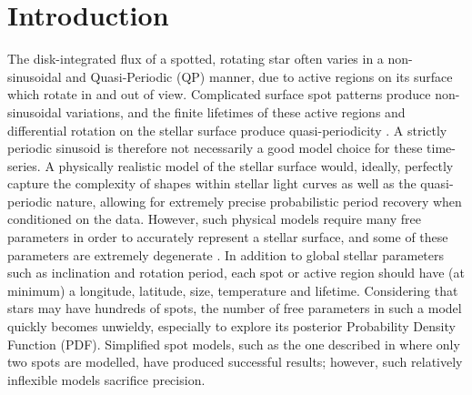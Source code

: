 \documentclass[a4paper,fleqn,usenatbib,useAMS]{mnras}
\newcommand{\eg}{{\it e.g.}}
\begin{document}
\section{Introduction}
\label{sec:intro}

The disk-integrated flux of a spotted, rotating star often varies in a
non-sinusoidal and Quasi-Periodic (QP) manner, due to active regions on its
surface which rotate in and out of view.
Complicated surface spot patterns produce non-sinusoidal variations, and the
finite lifetimes of these active regions and differential rotation on the
stellar surface produce quasi-periodicity \citep{Dumusque2011}.
A strictly periodic sinusoid is therefore not necessarily a good model choice
for these time-series.
A physically realistic model of the stellar surface
would, ideally,  perfectly capture the complexity of shapes
within stellar light curves as well as the quasi-periodic nature, allowing for
extremely precise probabilistic period recovery when conditioned on the data.
However, such physical models require many free parameters in order to
accurately represent a stellar surface, and some of these parameters are
extremely degenerate \citep[\eg][]{Russell1906, Jeffers2009, Kipping2012}.
In addition to global stellar parameters such as inclination and rotation
period, each spot or active region should have (at minimum) a longitude,
latitude, size, temperature and lifetime.
Considering that stars may have hundreds of spots, the number of free
parameters in such a model quickly becomes unwieldy, especially to explore its
posterior Probability Density Function (PDF).
Simplified spot models, such as the one described in \citet{Lanza2014} where
only two spots are modelled, have produced successful results; however, such
relatively inflexible models sacrifice precision.
\end{document}
